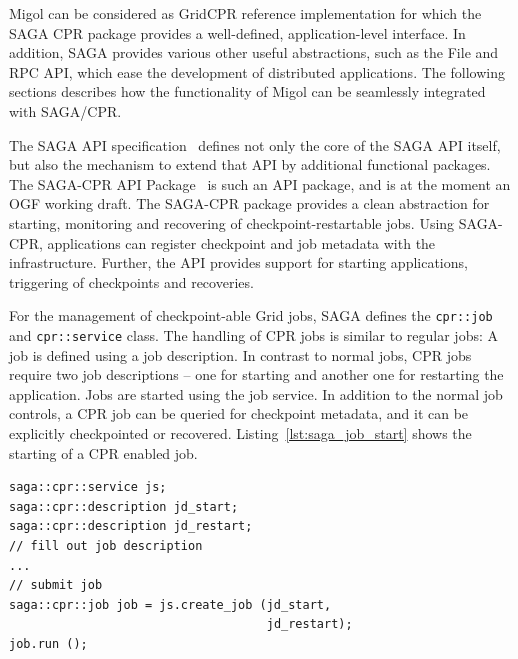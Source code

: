 \documentclass[times, 10pt, twocolumn]{article}
\newcommand{\up}{\vspace*{-1em}}
\begin{document}
Migol can be considered as GridCPR reference implementation for which the SAGA CPR package 
provides a well-defined, application-level interface.
In addition, SAGA provides various other useful abstractions, such as the File and 
RPC API, which ease the development of distributed 
applications. The following sections describes how the functionality of Migol 
can be seamlessly integrated with SAGA/CPR. 





\up
The SAGA API specification~\cite{saga_gfd90} defines not only the
core of the SAGA API itself, but also the mechanism to extend that API
by additional functional packages.  The SAGA-CPR API
Package~\cite{saga_cpr_draft} is such an API package, and is at the
moment an OGF working draft. 
The SAGA-CPR package provides a clean abstraction for starting,
monitoring and recovering of checkpoint-restartable jobs.
Using SAGA-CPR, applications can register checkpoint and job metadata with the infrastructure. 
Further, the API provides support for starting applications, triggering of checkpoints and recoveries.

For the management of checkpoint-able Grid jobs, SAGA defines the \texttt{cpr::job} and \texttt{cpr::service} class. The handling of 
CPR jobs is similar to regular jobs: A job is defined using a job description. In contrast to normal jobs, 
CPR jobs require  two job descriptions -- one for starting and another one for restarting the application.
Jobs are started using the job service. In addition to the normal job controls, a CPR job can be queried for checkpoint metadata, and 
it can be explicitly checkpointed or recovered. Listing~\ref{lst:saga_job_start} shows the starting of a CPR enabled job.


\begin{lstlisting}[style=myListing, caption={\small \bf SAGA-CPR: Starting a Job}, float=t, label={lst:saga_job_start}]
saga::cpr::service js; 
saga::cpr::description jd_start;
saga::cpr::description jd_restart;
// fill out job description
...
// submit job  
saga::cpr::job job = js.create_job (jd_start, 
                                    jd_restart);
job.run ();
\end{lstlisting}
\end{document}
